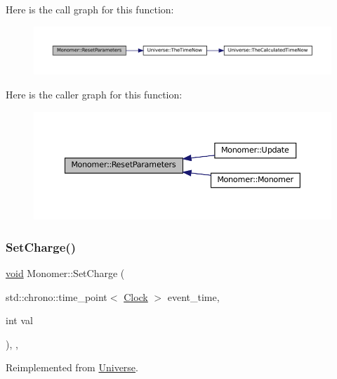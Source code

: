 Here is the call graph for this function\+:\nopagebreak
\begin{figure}[H]
\begin{center}
\leavevmode
\includegraphics[width=350pt]{class_monomer_a16a692cf11117581c9b4ebbed3c04c9c_cgraph}
\end{center}
\end{figure}
Here is the caller graph for this function\+:\nopagebreak
\begin{figure}[H]
\begin{center}
\leavevmode
\includegraphics[width=350pt]{class_monomer_a16a692cf11117581c9b4ebbed3c04c9c_icgraph}
\end{center}
\end{figure}
\mbox{\label{class_monomer_a1ee35c888318e590082e6cd1772bb430}} 
\subsubsection{\texorpdfstring{Set\+Charge()}{SetCharge()}}
{\footnotesize\ttfamily \mbox{\hyperlink{glad_8h_a950fc91edb4504f62f1c577bf4727c29}{void}} Monomer\+::\+Set\+Charge (\begin{DoxyParamCaption}\item[{std\+::chrono\+::time\+\_\+point$<$ \mbox{\hyperlink{universe_8h_a0ef8d951d1ca5ab3cfaf7ab4c7a6fd80}{Clock}} $>$}]{event\+\_\+time,  }\item[{int}]{val }\end{DoxyParamCaption})\hspace{0.3cm}{\ttfamily [inline]}, {\ttfamily [final]}, {\ttfamily [virtual]}}



Reimplemented from \mbox{\hyperlink{class_universe_a3b3da7c86a7b75e5e5c0b7972ac82a87}{Universe}}.



